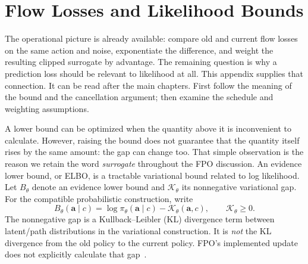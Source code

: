 \chapter{Flow Losses and Likelihood Bounds}
\label{app:bounds}

The operational picture is already available: compare old and current flow losses on the same action and noise, exponentiate the difference, and weight the resulting clipped surrogate by advantage. The remaining question is why a prediction loss should be relevant to likelihood at all. This appendix supplies that connection. It can be read after the main chapters. First follow the meaning of the bound and the cancellation argument; then examine the schedule and weighting assumptions.

A lower bound can be optimized when the quantity above it is inconvenient to calculate. However, raising the bound does not guarantee that the quantity itself rises by the same amount: the gap can change too. That simple observation is the reason we retain the word \emph{surrogate} throughout the FPO discussion.
An evidence lower bound, or ELBO, is a tractable variational bound related to log likelihood. Let $B_\theta$ denote an evidence lower bound and $\mathcal K_\theta$ its nonnegative variational gap. For the compatible probabilistic construction, write
\begin{equation}
 B_\theta(\mathbf a\mid c)=\log\pi_\theta(\mathbf a\mid c)-\mathcal K_\theta(\mathbf a,c),
 \qquad \mathcal K_\theta\geq0.
 \label{eq:elbo}
\end{equation}
The nonnegative gap is a Kullback--Leibler (KL) divergence term between latent/path distributions in the variational construction. It is \emph{not} the KL divergence from the old policy to the current policy. FPO's implemented update does not explicitly calculate that gap~\citep{fpo}.

